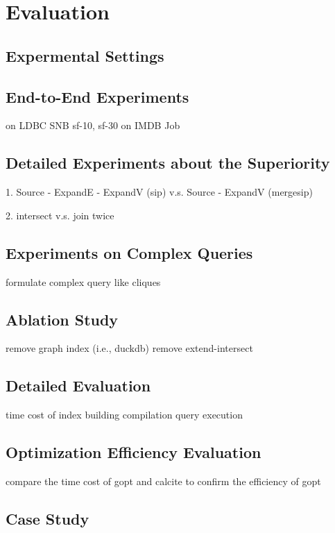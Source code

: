 \section{Evaluation}


\subsection{Expermental Settings}



\subsection{End-to-End Experiments}

on LDBC SNB sf-10, sf-30
on IMDB Job

\subsection{Detailed Experiments about the Superiority}

1. Source - ExpandE - ExpandV (sip) v.s. Source - ExpandV (mergesip)

2. intersect v.s. join twice

\subsection{Experiments on Complex Queries}

formulate complex query like cliques


\subsection{Ablation Study}

remove graph index (i.e., duckdb)
remove extend-intersect


\subsection{Detailed Evaluation}

time cost of index building
compilation
query execution

\subsection{Optimization Efficiency Evaluation}

compare the time cost of gopt and calcite to confirm the efficiency of gopt


\subsection{Case Study}
